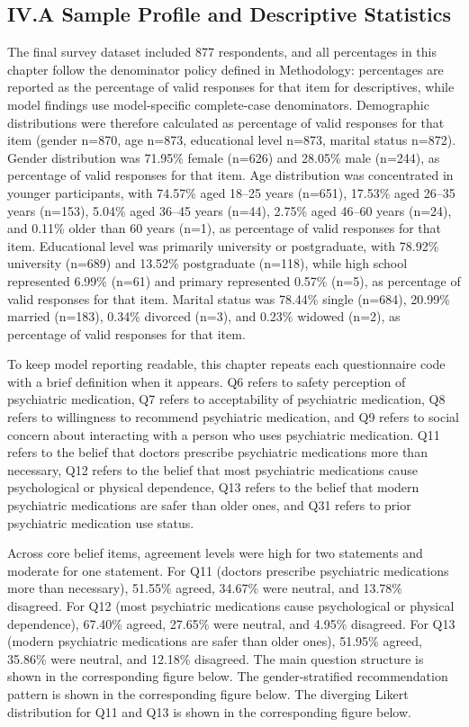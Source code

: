\documentclass[12pt,a4paper]{article}
\begin{document}
\subsection*{IV.A Sample Profile and Descriptive Statistics}
The final survey dataset included 877 respondents, and all percentages in this chapter follow the denominator policy defined in Methodology: percentages are reported as the percentage of valid responses for that item for descriptives, while model findings use model-specific complete-case denominators. Demographic distributions were therefore calculated as percentage of valid responses for that item (gender n=870, age n=873, educational level n=873, marital status n=872). Gender distribution was 71.95\% female (n=626) and 28.05\% male (n=244), as percentage of valid responses for that item. Age distribution was concentrated in younger participants, with 74.57\% aged 18–25 years (n=651), 17.53\% aged 26–35 years (n=153), 5.04\% aged 36–45 years (n=44), 2.75\% aged 46–60 years (n=24), and 0.11\% older than 60 years (n=1), as percentage of valid responses for that item. Educational level was primarily university or postgraduate, with 78.92\% university (n=689) and 13.52\% postgraduate (n=118), while high school represented 6.99\% (n=61) and primary represented 0.57\% (n=5), as percentage of valid responses for that item. Marital status was 78.44\% single (n=684), 20.99\% married (n=183), 0.34\% divorced (n=3), and 0.23\% widowed (n=2), as percentage of valid responses for that item.

To keep model reporting readable, this chapter repeats each questionnaire code with a brief definition when it appears. Q6 refers to safety perception of psychiatric medication, Q7 refers to acceptability of psychiatric medication, Q8 refers to willingness to recommend psychiatric medication, and Q9 refers to social concern about interacting with a person who uses psychiatric medication. Q11 refers to the belief that doctors prescribe psychiatric medications more than necessary, Q12 refers to the belief that most psychiatric medications cause psychological or physical dependence, Q13 refers to the belief that modern psychiatric medications are safer than older ones, and Q31 refers to prior psychiatric medication use status.

Across core belief items, agreement levels were high for two statements and moderate for one statement. For Q11 (doctors prescribe psychiatric medications more than necessary), 51.55\% agreed, 34.67\% were neutral, and 13.78\% disagreed. For Q12 (most psychiatric medications cause psychological or physical dependence), 67.40\% agreed, 27.65\% were neutral, and 4.95\% disagreed. For Q13 (modern psychiatric medications are safer than older ones), 51.95\% agreed, 35.86\% were neutral, and 12.18\% disagreed. The main question structure is shown in the corresponding figure below. The gender-stratified recommendation pattern is shown in the corresponding figure below. The diverging Likert distribution for Q11 and Q13 is shown in the corresponding figure below.
\end{document}
